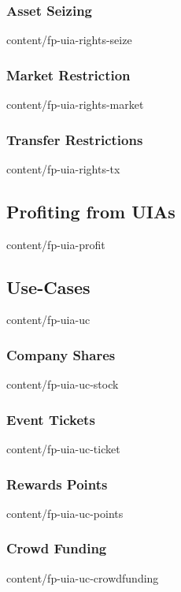 \documentclass[conference,final,10pt,a4paper]{IEEEtran}
\begin{document}
\subsubsection  { Asset Seizing                                    }  { content/fp-uia-rights-seize    } 
\subsubsection  { Market Restriction                               }  { content/fp-uia-rights-market   } 
\subsubsection  { Transfer Restrictions                            }  { content/fp-uia-rights-tx       } 
\subsection     { Profiting from UIAs                              }  { content/fp-uia-profit          } 
\subsection     { Use-Cases                                        }  { content/fp-uia-uc              } 
\subsubsection  { Company Shares                                   }  { content/fp-uia-uc-stock        } 
\subsubsection  { Event Tickets                                    }  { content/fp-uia-uc-ticket       } 
\subsubsection  { Rewards Points                                   }  { content/fp-uia-uc-points       } 
\subsubsection  { Crowd Funding                                    }  { content/fp-uia-uc-crowdfunding } 
\end{document}
